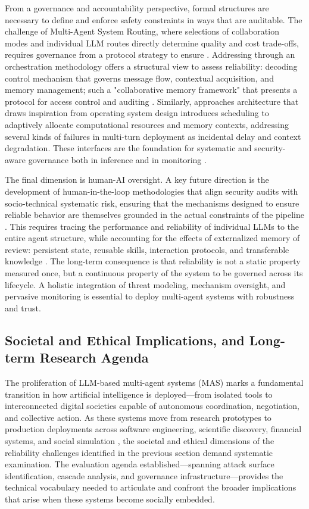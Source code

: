 \documentclass[11pt,a4paper]{article}
\begin{document}
From a governance and accountability perspective, formal structures are necessary to define and enforce safety constraints in ways that are auditable. The challenge of Multi-Agent System Routing, where selections of collaboration modes and individual LLM routes directly determine quality and cost trade-offs, requires governance from a protocol strategy to ensure \cite{arxiv:2502.11133v1}. Addressing through an orchestration methodology offers a structural view to assess reliability: decoding control mechanism that governs message flow, contextual acquisition, and memory management; such a "collaborative memory framework" that presents a protocol for access control and auditing \cite{arxiv:2505.18279v1}. Similarly, approaches architecture that draws inspiration from operating system design introduces scheduling to adaptively allocate computational resources and memory contexts, addressing several kinds of failures in multi-turn deployment as incidental delay and context degradation. These interfaces are the foundation for systematic and security-aware governance both in inference and in monitoring \cite{arxiv:2603.13110v1}.

The final dimension is human-AI oversight. A key future direction is the development of human-in-the-loop methodologies that align security audits with socio-technical systematic risk, ensuring that the mechanisms designed to ensure reliable behavior are themselves grounded in the actual constraints of the pipeline \cite{arxiv:2604.02460v2}. This requires tracing the performance and reliability of individual LLMs to the entire agent structure, while accounting for the effects of externalized memory of review: persistent state, reusable skills, interaction protocols, and transferable knowledge \cite{arxiv:2604.08224v1}. The long-term consequence is that reliability is not a static property measured once, but a continuous property of the system to be governed across its lifecycle. A holistic integration of threat modeling, mechanism oversight, and pervasive monitoring is essential to deploy multi-agent systems with robustness and trust.


\subsection{Societal and Ethical Implications, and Long-term Research Agenda}


The proliferation of LLM-based multi-agent systems (MAS) marks a fundamental transition in how artificial intelligence is deployed---from isolated tools to interconnected digital societies capable of autonomous coordination, negotiation, and collective action. As these systems move from research prototypes to production deployments across software engineering, scientific discovery, financial systems, and social simulation \cite{arxiv:2412.17481v2,arxiv:2508.17692v1}, the societal and ethical dimensions of the reliability challenges identified in the previous section demand systematic examination. The evaluation agenda established---spanning attack surface identification, cascade analysis, and governance infrastructure---provides the technical vocabulary needed to articulate and confront the broader implications that arise when these systems become socially embedded.
\end{document}
